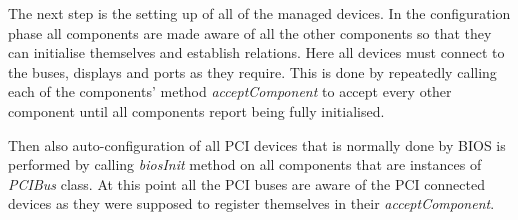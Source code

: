 The next step is the setting up of all of the managed devices. In the
configuration phase all components are made aware of all the other components
so that they can initialise themselves and establish relations. Here all
devices must connect to the buses, displays and ports as they require. This is
done by repeatedly calling each of the components' method \emph{acceptComponent} to
accept every other component until all components report being fully
initialised.

\begin{codeblock}
    
\end{codeblock}
            
%
%

Then also auto-configuration of all PCI devices that is normally done by BIOS
is performed by calling \emph{biosInit} method on all components that are
instances of \emph{PCIBus} class. At this point all the PCI buses are aware of
the PCI connected devices as they were supposed to register themselves in their
\emph{acceptComponent}.

\begin{codeblock}
    
\end{codeblock}

